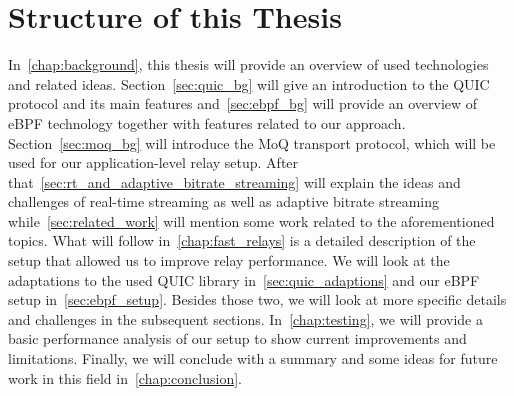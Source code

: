 \section{Structure of this Thesis}\label{sec:structure_of_thesis}

In~\autoref{chap:background}, this thesis will provide an overview of used technologies
and related ideas.
Section~\ref{sec:quic_bg} will give an introduction to the QUIC protocol and its main features 
and~\autoref{sec:ebpf_bg} will provide an overview of eBPF technology together with features related to 
our approach.
Section~\ref{sec:moq_bg} will introduce the MoQ transport protocol, which will be used 
for our application-level relay setup.
After that~\autoref{sec:rt_and_adaptive_bitrate_streaming} will explain the ideas and challenges of 
real-time streaming as well as adaptive bitrate streaming while~\autoref{sec:related_work} will 
mention some work related to the aforementioned topics.
What will follow in~\autoref{chap:fast_relays} is a detailed description of the setup that 
allowed us to improve relay performance. 
We will look at the adaptations to the used QUIC library in~\autoref{sec:quic_adaptions} and 
our eBPF setup in~\autoref{sec:ebpf_setup}. Besides those two, we will look at more specific details and challenges in the subsequent sections.
In~\autoref{chap:testing}, we will provide a basic performance analysis of our setup to show current improvements and limitations.
Finally, we will conclude with a summary and some ideas for future work in this field in~\autoref{chap:conclusion}.